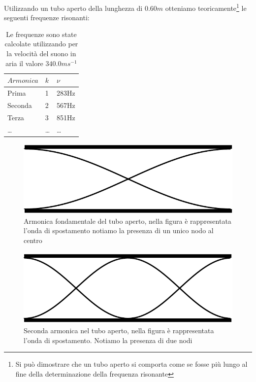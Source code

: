 \documentclass[a4paper,10pt,oneside]{article}
\begin{document}
Utilizzando un tubo aperto della lunghezza di $0.60m$ otteniamo teoricamente\footnote{Si può dimostrare che un tubo aperto si comporta come se fosse più lungo al fine della determinazione della frequenza risonante} le seguenti frequenze risonanti:


\begin{table}[H]
\begin{center}
\begin{tabular}{lll}\toprule
$Armonica$ &$k$&$\nu$\\ \midrule
Prima & 1 & 283Hz\\
Seconda & 2&567Hz\\
Terza & 3&851Hz\\
\ldots &\ldots&\ldots \\ \bottomrule
\end{tabular}\caption{Le frequenze sono state calcolate utilizzando per la velocità del suono in aria il valore $340.0ms^{-1}$}\label{tab:aperto}
\end{center}
\end{table}


\begin{figure}[H]
 \centering
 \includegraphics[width=\textwidth]{../Immagini/aperto_1.png}
 \caption{Armonica fondamentale del tubo aperto, nella figura è rappresentata l'onda di spostamento notiamo la presenza di un unico nodo al centro}
 \label{fig:aperto_fondamentale}
\end{figure}

\begin{figure}[H]
 \centering
 \includegraphics[width=\textwidth]{../Immagini/aperto_2.png}
 \caption{Seconda armonica nel tubo aperto, nella figura è rappresentata l'onda di spostamento. Notiamo la presenza di due nodi}
 \label{fig:aperto_seconda}
\end{figure}
\end{document}
